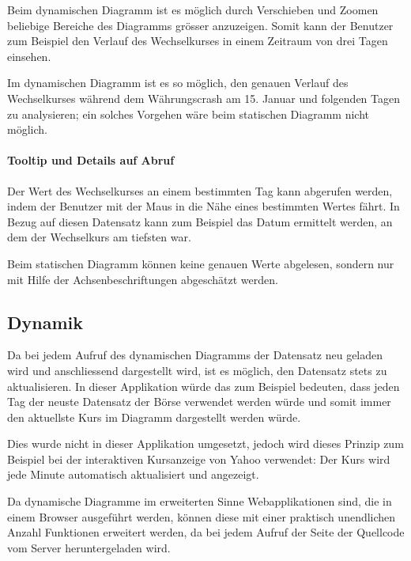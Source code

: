 Beim dynamischen Diagramm ist es möglich durch Verschieben und Zoomen beliebige Bereiche des Diagramms grösser anzuzeigen. Somit kann der Benutzer zum Beispiel den Verlauf des Wechselkurses in einem Zeitraum von drei Tagen einsehen.

Im dynamischen Diagramm ist es so möglich, den genauen Verlauf des Wechselkurses während dem Währungscrash am 15. Januar und folgenden Tagen zu analysieren; ein solches Vorgehen wäre beim statischen Diagramm nicht möglich.

\paragraph{Tooltip und Details auf Abruf} 

Der Wert des Wechselkurses an einem bestimmten Tag kann abgerufen werden, indem der Benutzer mit der Maus in die Nähe eines bestimmten Wertes fährt. In Bezug auf diesen Datensatz kann zum Beispiel das Datum ermittelt werden, an dem der Wechselkurs am tiefsten war.

Beim statischen Diagramm können keine genauen Werte abgelesen, sondern nur mit Hilfe der Achsenbeschriftungen abgeschätzt werden.

\subsection{Dynamik}

Da bei jedem Aufruf des dynamischen Diagramms der Datensatz neu geladen wird und anschliessend dargestellt wird, ist es möglich, den Datensatz stets zu aktualisieren. In dieser Applikation würde das zum Beispiel bedeuten, dass jeden Tag der neuste Datensatz der Börse verwendet werden würde und somit immer den aktuellste Kurs im Diagramm dargestellt werden würde.

Dies wurde nicht in dieser Applikation umgesetzt, jedoch wird dieses Prinzip zum Beispiel bei der interaktiven Kursanzeige von Yahoo \cite{yahoo} verwendet: Der Kurs wird jede Minute automatisch aktualisiert und angezeigt.

Da dynamische Diagramme im erweiterten Sinne Webapplikationen sind, die in einem Browser ausgeführt werden, können diese mit einer praktisch unendlichen Anzahl Funktionen erweitert werden, da bei jedem Aufruf der Seite der Quellcode vom Server heruntergeladen wird.
